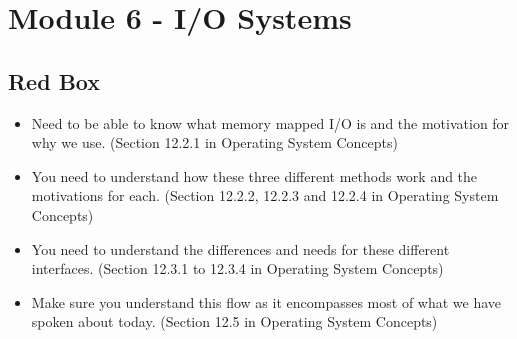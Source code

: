 \section{Module 6 - I/O Systems}
\subsection{Red Box}
\begin{itemize}
    \item Need to be able to know what memory mapped I/O is and the motivation for why we use. (Section 12.2.1 in
    Operating System Concepts)
    \item You need to understand how these three different methods work and the motivations for each. (Section 12.2.2,
    12.2.3 and 12.2.4 in Operating System Concepts)
    \item You need to understand the differences and needs for these different interfaces. (Section 12.3.1 to 12.3.4 in
    Operating System Concepts)
    \item Make sure you understand this flow as it encompasses most of what we have spoken about today. (Section 12.5
    in Operating System Concepts)
\end{itemize}